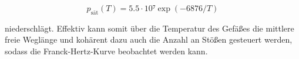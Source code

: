 \begin{equation*}
    p_\text{sät}(T) = 5.5\cdot10⁷\exp\left(-6876/T\right)
\end{equation*}

\noindent niederschlägt. Effektiv kann somit über die Temperatur des Gefäßes die mittlere freie Weglänge und kohärent dazu auch die Anzahl an Stößen gesteuert werden, 
sodass die Franck-Hertz-Kurve beobachtet werden kann.


%